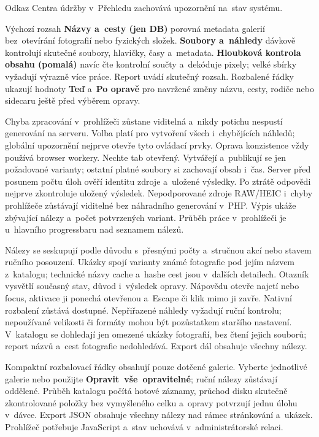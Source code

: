 \documentclass[11pt,a4paper]{article}
\newcommand{\ui}[1]{\textbf{#1}}
\begin{document}
Odkaz Centra údržby v~Přehledu zachovává upozornění na~stav systému.

Výchozí rozsah \ui{Názvy a~cesty (jen DB)} porovná metadata galerií
bez~otevírání fotografií nebo fyzických složek. \ui{Soubory a~náhledy} dávkově
kontrolují skutečné soubory, hlavičky, časy a~metadata. \ui{Hloubková kontrola
obsahu (pomalá)} navíc čte kontrolní součty a~dekóduje pixely; velké sbírky
vyžadují výrazně více práce. Report uvádí skutečný rozsah. Rozbalené řádky
ukazují hodnoty \ui{Teď} a~\ui{Po opravě} pro navržené změny názvu, cesty,
rodiče nebo sidecaru ještě před výběrem opravy.

Chyba zpracování v~prohlížeči zůstane viditelná a~nikdy potichu nespustí
generování na serveru. Volba platí pro vytvoření všech i~chybějících náhledů;
globální upozornění nejprve otevře tyto ovládací prvky. Oprava konzistence
vždy používá browser workery. Nechte tab otevřený. Vytvářejí a~publikují se
jen požadované varianty; ostatní platné soubory si zachovají obsah i~čas.
Server před posunem počtu úloh ověří identitu zdroje a~uložené výsledky.
Po ztrátě odpovědi nejprve zkontroluje uložený výsledek. Nepodporované zdroje
RAW/HEIC i~chyby prohlížeče zůstávají viditelné bez náhradního generování
v~PHP. Výpis ukáže zbývající nálezy a~počet potvrzených variant.
Průběh práce v~prohlížeči je u~hlavního progressbaru nad seznamem nálezů.

Nálezy se seskupují podle důvodu s~přesnými počty a~stručnou akcí nebo stavem
ručního posouzení. Ukázky spojí varianty známé fotografie pod jejím názvem
z~katalogu; technické názvy cache a~hashe cest jsou v~dalších detailech.
Otazník vysvětlí současný stav, důvod i~výsledek opravy. Nápovědu otevře najetí
nebo focus, aktivace ji ponechá otevřenou a~Escape či klik mimo ji zavře.
Nativní rozbalení zůstává dostupné. Nepřiřazené náhledy vyžadují ruční kontrolu;
nepoužívané velikosti či formáty mohou být pozůstatkem staršího nastavení.
V~katalogu se dohledají jen omezené ukázky fotografií, bez čtení jejich souborů;
report názvů a~cest fotografie nedohledává. Export dál obsahuje všechny nálezy.

Kompaktní rozbalovací řádky obsahují pouze dotčené galerie. Vyberte jednotlivé
galerie nebo použijte \ui{Opravit~vše~opravitelné}; ruční nálezy zůstávají
oddělené. Průběh katalogu počítá hotové záznamy, průchod disku skutečně
zkontrolované položky bez vymyšleného celku a~opravy potvrzují jednu úlohu
v~dávce. Export JSON obsahuje všechny nálezy nad rámec stránkování a~ukázek.
Prohlížeč potřebuje JavaScript a~stav uchovává v~administrátorské relaci.
\end{document}
